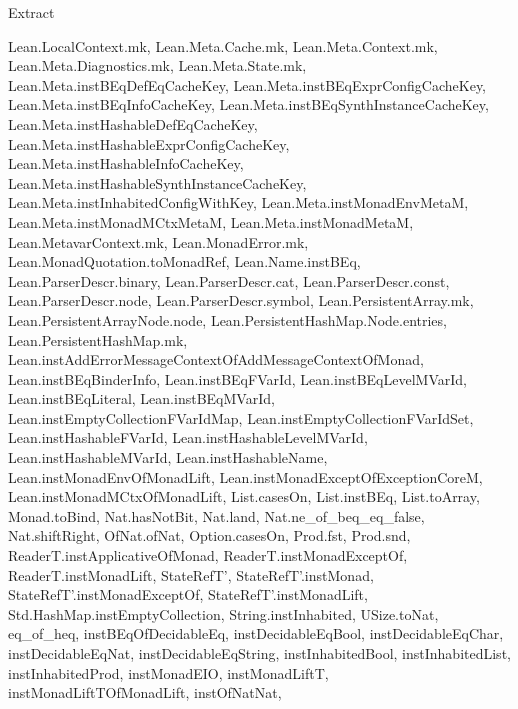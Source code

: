 \begin{lexlean}{Extract}
\begin{toolingmodule}
{{        Lean.LocalContext.mk,
        Lean.Meta.Cache.mk,
        Lean.Meta.Context.mk,
        Lean.Meta.Diagnostics.mk,
        Lean.Meta.State.mk,
        Lean.Meta.instBEqDefEqCacheKey,
        Lean.Meta.instBEqExprConfigCacheKey,
        Lean.Meta.instBEqInfoCacheKey,
        Lean.Meta.instBEqSynthInstanceCacheKey,
        Lean.Meta.instHashableDefEqCacheKey,
        Lean.Meta.instHashableExprConfigCacheKey,
        Lean.Meta.instHashableInfoCacheKey,
        Lean.Meta.instHashableSynthInstanceCacheKey,
        Lean.Meta.instInhabitedConfigWithKey,
        Lean.Meta.instMonadEnvMetaM,
        Lean.Meta.instMonadMCtxMetaM,
        Lean.Meta.instMonadMetaM,
        Lean.MetavarContext.mk,
        Lean.MonadError.mk,
        Lean.MonadQuotation.toMonadRef,
        Lean.Name.instBEq,
        Lean.ParserDescr.binary,
        Lean.ParserDescr.cat,
        Lean.ParserDescr.const,
        Lean.ParserDescr.node,
        Lean.ParserDescr.symbol,
        Lean.PersistentArray.mk,
        Lean.PersistentArrayNode.node,
        Lean.PersistentHashMap.Node.entries,
        Lean.PersistentHashMap.mk,
        Lean.instAddErrorMessageContextOfAddMessageContextOfMonad,
        Lean.instBEqBinderInfo,
        Lean.instBEqFVarId,
        Lean.instBEqLevelMVarId,
        Lean.instBEqLiteral,
        Lean.instBEqMVarId,
        Lean.instEmptyCollectionFVarIdMap,
        Lean.instEmptyCollectionFVarIdSet,
        Lean.instHashableFVarId,
        Lean.instHashableLevelMVarId,
        Lean.instHashableMVarId,
        Lean.instHashableName,
        Lean.instMonadEnvOfMonadLift,
        Lean.instMonadExceptOfExceptionCoreM,
        Lean.instMonadMCtxOfMonadLift,
        List.casesOn,
        List.instBEq,
        List.toArray,
        Monad.toBind,
        Nat.hasNotBit,
        Nat.land,
        Nat.ne_of_beq_eq_false,
        Nat.shiftRight,
        OfNat.ofNat,
        Option.casesOn,
        Prod.fst,
        Prod.snd,
        ReaderT.instApplicativeOfMonad,
        ReaderT.instMonadExceptOf,
        ReaderT.instMonadLift,
        StateRefT',
        StateRefT'.instMonad,
        StateRefT'.instMonadExceptOf,
        StateRefT'.instMonadLift,
        Std.HashMap.instEmptyCollection,
        String.instInhabited,
        USize.toNat,
        eq_of_heq,
        instBEqOfDecidableEq,
        instDecidableEqBool,
        instDecidableEqChar,
        instDecidableEqNat,
        instDecidableEqString,
        instInhabitedBool,
        instInhabitedList,
        instInhabitedProd,
        instMonadEIO,
        instMonadLiftT,
        instMonadLiftTOfMonadLift,
        instOfNatNat,
}}
\end{toolingmodule}
\end{lexlean}
